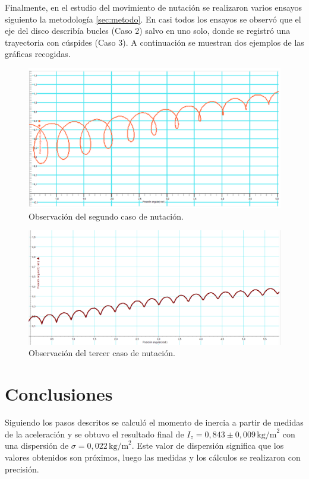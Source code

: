 \documentclass[a4paper]{article}
\begin{document}
Finalmente, en el estudio del movimiento de nutación se realizaron varios ensayos siguiento la metodología \ref{sec:metodo}. En casi todos los ensayos se observó que el eje del disco describía bucles (Caso 2) salvo en uno solo, donde se registró una trayectoria con cúspides (Caso 3). A continuación se muestran dos ejemplos de las gráficas recogidas.
\begin{figure}[H]
\begin{center}
\includegraphics[width=12 cm]{nuta2.png}
\caption{Observación del segundo caso de nutación.}
\end{center}
\end{figure}
\begin{figure}[H]
\begin{center}
\includegraphics[width=12 cm]{nuta3.png}
\caption{Observación del tercer caso de nutación.}
\end{center}
\end{figure}
\section{Conclusiones}
Siguiendo los pasos descritos se calculó el momento de inercia a partir de medidas de la aceleración y se obtuvo el resultado final de $I_z=0,843\pm 0,009\,\text{kg/m}^2$ con una dispersión de $\sigma=0,022\,\text{kg/m}^2$. Este valor de dispersión significa que los valores obtenidos son próximos, luego las medidas y los cálculos se realizaron con precisión.
\end{document}
